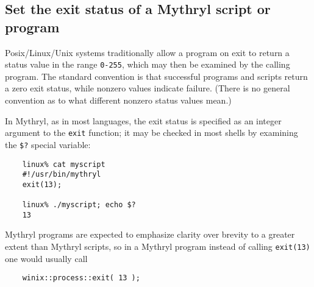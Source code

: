 \subsection{Set the exit status of a Mythryl script or program}

Posix/Linux/Unix systems traditionally allow a program on exit to 
return a status value in the range {\tt 0-255}, which may then be 
examined by the calling program.  The standard convention is that 
successful programs and scripts return a zero exit status, while 
nonzero values indicate failure.  (There is no general convention 
as to what different nonzero status values mean.)

In Mythryl, as in most languages, the exit status is specified as 
an integer argument to  the {\tt exit} function;  it may be checked 
in most shells by  examining the {\tt \$?} special variable: 

\begin{verbatim}
    linux% cat myscript
    #!/usr/bin/mythryl
    exit(13);

    linux% ./myscript; echo $?
    13
\end{verbatim}

Mythryl programs are expected to emphasize clarity over brevity 
to a greater extent than Mythryl scripts, so in a Mythryl program 
instead of calling {\tt exit(13)} one would usually call 

\begin{verbatim}
    winix::process::exit( 13 );
\end{verbatim}

\cutend*


